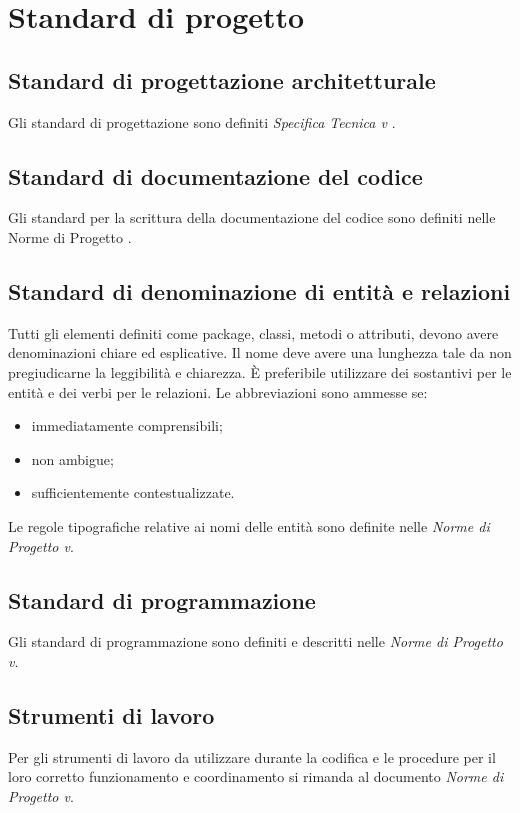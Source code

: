 \section{Standard di progetto}

	\subsection{Standard di progettazione architetturale}
Gli standard di progettazione sono definiti \emph{Specifica Tecnica v} \VersioneST{} .

	\subsection{Standard di documentazione del codice}
Gli standard per la scrittura della documentazione del codice sono definiti nelle Norme di Progetto \VersioneNP{}.

	\subsection{Standard di denominazione di entità e relazioni}
Tutti gli elementi definiti come package, classi, metodi o attributi, devono avere
denominazioni chiare ed esplicative. Il nome deve avere una lunghezza tale da non
pregiudicarne la leggibilità e chiarezza. È preferibile utilizzare dei sostantivi per le entità e
dei verbi per le relazioni. Le abbreviazioni sono ammesse se:
\begin{itemize}
\item immediatamente comprensibili;
\item non ambigue;
\item sufficientemente contestualizzate.
\end{itemize}

Le regole tipografiche relative ai nomi delle entità sono definite nelle \emph{Norme di Progetto v}\VersioneNP{}.

	\subsection{Standard di programmazione}
Gli standard di programmazione sono definiti e descritti nelle \emph{Norme di Progetto v}\VersioneNP{}.

	\subsection{Strumenti di lavoro}
Per gli strumenti di lavoro da utilizzare durante la codifica e le procedure per il loro corretto
funzionamento e coordinamento si rimanda al documento \emph{Norme di Progetto v}\VersioneNP{}.